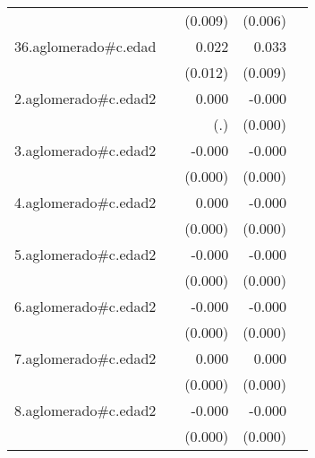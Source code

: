 {\begin{longtable}{l*{4}{D{.}{.}{-1}}}
            &                     &     (0.009)         &     (0.006)         &                     \\
\addlinespace
36.aglomerado#c.edad&                     &       0.022         &       0.033\sym{***}&                     \\
            &                     &     (0.012)         &     (0.009)         &                     \\
\addlinespace
2.aglomerado#c.edad2&                     &       0.000         &      -0.000         &                     \\
            &                     &         (.)         &     (0.000)         &                     \\
\addlinespace
3.aglomerado#c.edad2&                     &      -0.000         &      -0.000\sym{**} &                     \\
            &                     &     (0.000)         &     (0.000)         &                     \\
\addlinespace
4.aglomerado#c.edad2&                     &       0.000         &      -0.000         &                     \\
            &                     &     (0.000)         &     (0.000)         &                     \\
\addlinespace
5.aglomerado#c.edad2&                     &      -0.000         &      -0.000\sym{***}&                     \\
            &                     &     (0.000)         &     (0.000)         &                     \\
\addlinespace
6.aglomerado#c.edad2&                     &      -0.000         &      -0.000\sym{***}&                     \\
            &                     &     (0.000)         &     (0.000)         &                     \\
\addlinespace
7.aglomerado#c.edad2&                     &       0.000         &       0.000         &                     \\
            &                     &     (0.000)         &     (0.000)         &                     \\
\addlinespace
8.aglomerado#c.edad2&                     &      -0.000         &      -0.000         &                     \\
            &                     &     (0.000)         &     (0.000)         &                     \\

\end{longtable}}
